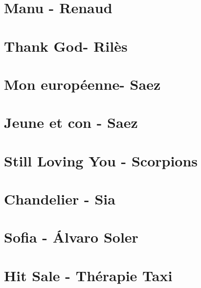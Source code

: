 \documentclass{guitartabs}
\begin{document}
\section{Manu - Renaud}
\begin{guitar}

\end{guitar}

\section{Thank God- Rilès}
\begin{guitar}

\end{guitar}

\section{Mon européenne- Saez}
\begin{guitar}

\end{guitar}


\section{Jeune et con - Saez}
\begin{guitar}

\end{guitar}

\section{Still Loving You - Scorpions}
\begin{guitar}

\end{guitar}

\section{Chandelier - Sia}
\begin{guitar}

\end{guitar}


\section{Sofia - Álvaro Soler}
\begin{guitar}

\end{guitar}


\section{Hit Sale - Thérapie Taxi}
\begin{guitar}

\end{guitar}
\end{document}
